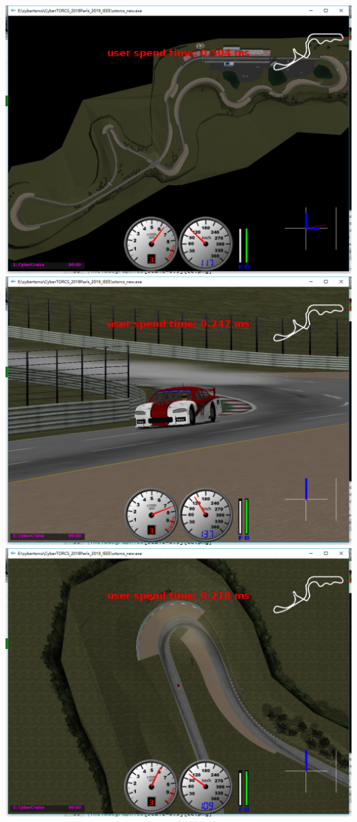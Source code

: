 \documentclass{article}
\begin{document}
\newline
\includegraphics[scale=0.3]{t3.png}
\newline
\includegraphics[scale=0.3]{t4.png}
\newline
\includegraphics[scale=0.3]{t5.png}
\end{document}

